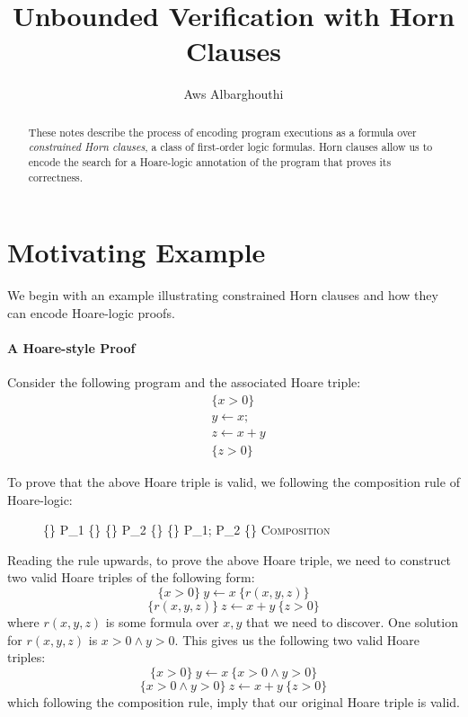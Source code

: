 \documentclass{amsart}
\theoremstyle{definition}
\theoremstyle{remark}
\numberwithin{equation}{section}
\begin{document}
\title{Unbounded Verification with Horn Clauses}

\author{Aws Albarghouthi}
\address{University of Wisconsin--Madison}

\maketitle

\begin{abstract}
These notes describe the process
of encoding program executions as a formula
over \emph{constrained Horn clauses},
a class of first-order logic formulas.
Horn clauses allow us to encode the search
for a Hoare-logic annotation of the program
that proves its correctness.
\end{abstract}

\section{Motivating Example}
We begin with an example illustrating constrained Horn
clauses and how they can encode Hoare-logic proofs.

\paragraph{A Hoare-style Proof}
Consider the following program and the associated
Hoare triple:
\begin{align*}
& \{x > 0\}\\
& y \gets x;\\
&z \gets x + y\\
& \{z > 0\}
\end{align*}

To prove that the above Hoare triple is valid,
we following the composition rule of Hoare-logic:

\begin{figure}[h]
  \centering
  \prooftree
       \{\phi\} P_1 \{\psi\} \quad\quad
       \{\psi\} P_2 \{\chi\}
  \justifies
  \{\phi\} P_1; P_2 \{\chi\}
  \using \textsc{Composition}
  \endprooftree
\end{figure}

Reading the rule upwards,
to prove the above Hoare triple,
we need to construct two valid Hoare triples
of the following form:
$$\{x> 0\} ~ y \gets x ~ \{r(x,y,z)\}$$
$$\{r(x,y,z)\} ~ z \gets x + y ~ \{z > 0\}$$
where $r(x,y,z)$ is some formula over $x,y$
that we need to discover.
One solution for
$r(x,y,z)$ is $x > 0 \land y > 0$.
This gives us the following two valid Hoare triples:
$$\{x> 0\} ~ y \gets x ~ \{x > 0 \land y > 0 \}$$
$$\{x > 0 \land y > 0\} ~ z \gets x + y ~ \{z > 0\}$$
which following the composition rule,
imply that our original Hoare triple is valid.
\end{document}
